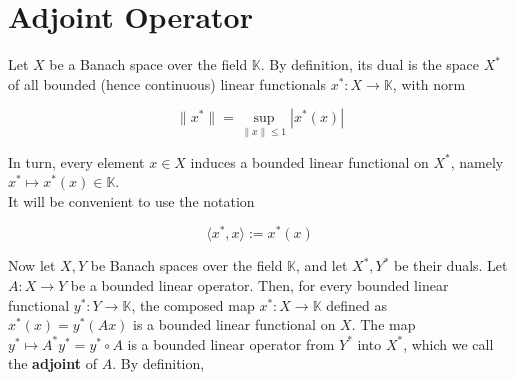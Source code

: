 \documentclass{article}
\begin{document}
\section{Adjoint Operator}
Let $X$ be a Banach space over the field $\mathbb{K}$. By definition, its dual is the space $X^*$ of all bounded (hence continuous) linear functionals $x^* : X \to \mathbb{K}$, with norm

\[
\|x^*\| = \sup_{\|x\| \leq 1} |x^*(x)|
\]

In turn, every element $x \in X$ induces a bounded linear functional on $X^*$, namely $x^* \mapsto  x^*(x) \in \mathbb{K}$. \\
It will be convenient to use the notation

\[
\langle x^*, x\rangle  := x^*(x)
\]


Now let $X, Y$ be Banach spaces over the field $\mathbb{K}$, and let $X^*, Y^*$ be their duals. Let $A : X \to Y$ be a bounded linear operator. Then, for every bounded linear functional $y^* : Y \to \mathbb{K}$, the composed map $x^* : X \to \mathbb{K}$ defined as $x^*(x) = y^*(Ax)$ is a bounded linear functional on $X$. The map $y^* \mapsto A^* y^* = y^* \circ A$ is a bounded linear operator from $Y^*$ into $X^*$, which we call the \textbf{adjoint} of $A$. By definition,
\end{document}
